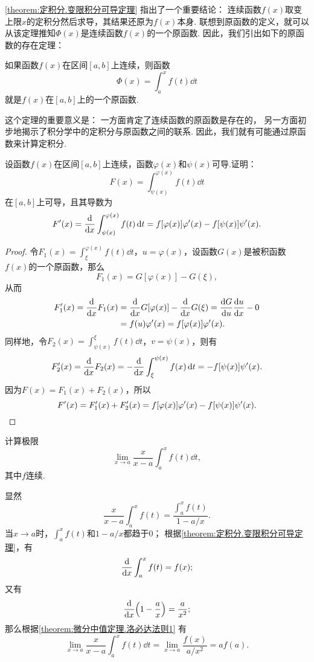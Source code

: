 \cref{theorem:定积分.变限积分可导定理} 指出了一个重要结论：
连续函数\(f(x)\)取变上限\(x\)的定积分然后求导，其结果还原为\(f(x)\)本身.
联想到原函数的定义，就可以从该定理推知\(\Phi(x)\)是连续函数\(f(x)\)的一个原函数.
因此，我们引出如下的原函数的存在定理：
\begin{theorem}[原函数存在定理]\label{theorem:定积分.原函数存在定理}
如果函数\(f(x)\)在区间\([a,b]\)上连续，则函数\[
\Phi(x) = \int_a^x f(t) \dd{t}
\]就是\(f(x)\)在\([a,b]\)上的一个原函数.
\end{theorem}
这个定理的重要意义是：
一方面肯定了连续函数的原函数是存在的，%
另一方面初步地揭示了积分学中的定积分与原函数之间的联系.
因此，我们就有可能通过原函数来计算定积分.

\begin{example}
设函数\(f(x)\)在区间\([a,b]\)上连续，函数\(\varphi(x)\)和\(\psi(x)\)可导.证明：\[
F(x) = \int_{\psi(x)}^{\varphi(x)} f(t) \dd{t}
\]在\([a,b]\)上可导，且其导数为\begin{equation}\label{equation:定积分.含参变量积分的导数1}
F'(x) = \dv{x} \int_{\psi(x)}^{\varphi(x)} f(t) \dd{t}
= f[\varphi(x)] \varphi'(x) - f[\psi(x)] \psi'(x).
\end{equation}
\begin{proof}
令\(F_1(x) = \int_{\xi}^{\varphi(x)} f(t) \dd{t}\)，\(u = \varphi(x)\)，设函数\(G(x)\)是被积函数\(f(x)\)的一个原函数，那么\[
F_1(x) = G[\varphi(x)] - G(\xi),
\]从而\begin{align*}
F'_1(x) = \dv{x} F_1(x)
&= \dv{x} G[\varphi(x)] - \dv{x} G(\xi) = \dv{G}{u} \dv{u}{x} - 0 \\
&= f(u) \varphi'(x) = f[\varphi(x)] \varphi'(x).
\end{align*}
同样地，令\(F_2(x) = \int_{\psi(x)}^{\xi} f(t) \dd{t}\)，\(v = \psi(x)\)，则有\[
F'_2(x) = \dv{x} F_2(x) = -\dv{x} \int_{\xi}^{\psi(x)} f(x) \dd{t}
= -f[\psi(x)] \psi'(x).
\]
因为\(F(x) = F_1(x) + F_2(x)\)，所以\[
F'(x) = F'_1(x) + F'_2(x)
= f[\varphi(x)] \varphi'(x) - f[\psi(x)] \psi'(x).
\qedhere
\]
\end{proof}
\end{example}

\begin{example}
计算极限\[
\lim\limits_{x \to a} \frac{x}{x-a} \int_a^x f(t) \dd{t},
\]其中\(f\)连续.
\begin{solution}
显然\[
\frac{x}{x-a} \int_a^x f(t)
= \frac{\int_a^x f(t)}{1 - a/x}.
\]
当\(x \to a\)时，\(\int_a^x f(t)\)和\(1 - a/x\)都趋于0；
根据\cref{theorem:定积分.变限积分可导定理}，有\[
\dv{x} \int_a^x f(t) = f(x);
\]又有\[
\dv{x}(1 - \frac{a}{x}) = \frac{a}{x^2};
\]那么根据\cref{theorem:微分中值定理.洛必达法则1} 有\[
\lim\limits_{x \to a} \frac{x}{x-a} \int_a^x f(t) \dd{t}
= \lim\limits_{x \to a} \frac{f(x)}{a/x^2}
= a f(a).
\]
\end{solution}
\end{example}


